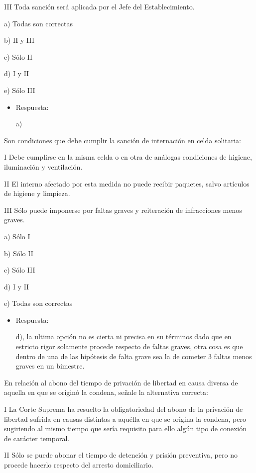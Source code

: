 \documentclass[letterpaper, 11pt]{article}
\begin{document}
III Toda sanción será aplicada por el Jefe del Establecimiento.


a) Todas son correctas

b) II y III

c) Sólo II

d) I y II

e) Sólo III

\begin{itemize}
\item Respuesta:

a)
\end{itemize}


Son condiciones que debe cumplir la sanción de internación en celda
solitaria:

I Debe cumplirse en la misma celda o en otra de análogas condiciones
de higiene, iluminación y ventilación.

II El interno afectado por esta medida no puede recibir paquetes,
salvo artículos de higiene y limpieza.

III Sólo puede imponerse por faltas graves y reiteración de
infracciones menos graves.


a) Sólo I

b) Sólo II

c) Sólo III

d) I y II

e) Todas son correctas

\begin{itemize}
\item Respuesta:

d), la ultima opción no es cierta ni precisa en su términos dado que
en estricto rigor solamente procede respecto de faltas graves, otra
cosa es que dentro de una de las hipótesis de falta grave sea la de
cometer 3 faltas menos graves en un bimestre.
\end{itemize}


En relación al abono del tiempo de privación de libertad en causa
diversa de aquella en que se originó la condena, señale la alternativa
correcta:


I La Corte Suprema ha resuelto la obligatoriedad del abono de la
privación de libertad sufrida en causas distintas a aquélla en que se
origina la condena, pero sugiriendo al mismo tiempo que sería
requisito para ello algún tipo de conexión de carácter temporal.

II Sólo se puede abonar el tiempo de detención y prisión preventiva,
pero no procede hacerlo respecto del arresto domiciliario.
\end{document}
